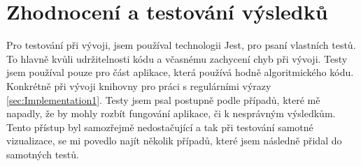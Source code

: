 \chapter{Zhodnocení a testování výsledků}\label{sec:Testing}

Pro testování při vývoji, jsem používal technologii Jest, pro psaní vlastních testů.
To hlavně kvůli udržitelnosti kódu a včasnému zachycení chyb při vývoji.
Testy jsem používal pouze pro část aplikace, která používá hodně algoritmického kódu.
Konkrétně při vývoji knihovny pro práci s regulárními výrazy \ref{sec:Implementation1}.
Testy jsem psal postupně podle případů, které mě napadly, že by mohly rozbít fungování aplikace, či k nesprávným výsledkům.
Tento přístup byl samozřejmě nedostačující a tak při testování samotné vizualizace, se mi povedlo najít několik případů, které jsem následně přidal do samotných testů.
